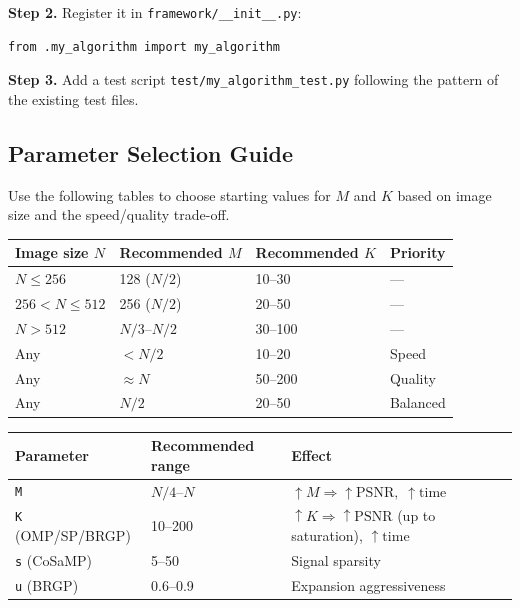\documentclass[12pt,a4paper]{article}
\newcommand{\cs}[1]{\texttt{#1}}          %
\begin{document}
\textbf{Step 2.} Register it in \cs{framework/\_\_init\_\_.py}:

\begin{lstlisting}[style=python]
from .my_algorithm import my_algorithm
\end{lstlisting}

\textbf{Step 3.} Add a test script \cs{test/my\_algorithm\_test.py} following
the pattern of the existing test files.

\subsection{Parameter Selection Guide}

Use the following tables to choose starting values for $M$ and $K$ based on
image size and the speed/quality trade-off.

\begin{center}
\begin{tabular}{llll}
  \toprule
  Image size $N$ & Recommended $M$ & Recommended $K$ & Priority \\
  \midrule
  $N \leq 256$          & 128 ($N/2$)   & 10--30  & ---      \\
  $256 < N \leq 512$    & 256 ($N/2$)   & 20--50  & ---      \\
  $N > 512$             & $N/3$--$N/2$  & 30--100 & ---      \\
  Any                   & $< N/2$       & 10--20  & Speed    \\
  Any                   & $\approx N$   & 50--200 & Quality  \\
  Any                   & $N/2$         & 20--50  & Balanced \\
  \bottomrule
\end{tabular}
\end{center}

\begin{center}
\begin{tabular}{lll}
  \toprule
  Parameter & Recommended range & Effect \\
  \midrule
  \cs{M} & $N/4$--$N$ & $\uparrow M \Rightarrow \uparrow\mathrm{PSNR},\;\uparrow\mathrm{time}$ \\
  \cs{K} (OMP/SP/BRGP) & 10--200 & $\uparrow K \Rightarrow \uparrow\mathrm{PSNR}$ (up to saturation), $\uparrow\mathrm{time}$ \\
  \cs{s} (CoSaMP) & 5--50 & Signal sparsity \\
  \cs{u} (BRGP) & 0.6--0.9 & Expansion aggressiveness \\
  \bottomrule
\end{tabular}
\end{center}
\end{document}

